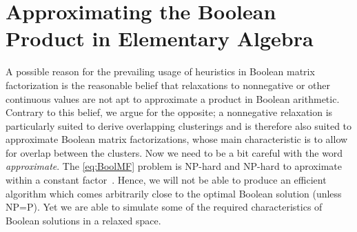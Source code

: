\section{Approximating the Boolean Product in Elementary Algebra}
A possible reason for the prevailing usage of heuristics in Boolean matrix factorization is the reasonable belief that relaxations to nonnegative or other  continuous values are not apt to approximate a product in Boolean arithmetic. Contrary to this belief, we argue for the opposite; a nonnegative relaxation is particularly suited to derive overlapping clusterings and is therefore also suited to approximate Boolean matrix factorizations, whose main characteristic is to allow for overlap between the clusters. Now we need to be a bit careful with the word \emph{approximate}. The \ref{eq:BoolMF} problem is NP-hard and NP-hard to aproximate within a constant factor~\citep{miettinen2008discrete}. Hence, we will not be able to produce an efficient algorithm which comes arbitrarily close to the optimal Boolean solution (unless NP=P). Yet we are able to simulate some of the required characteristics of Boolean solutions in a relaxed space. 

